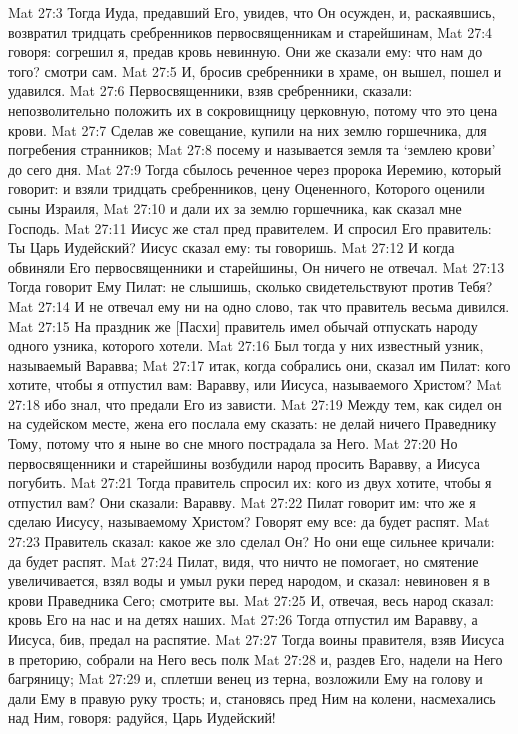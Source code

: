Mat 27:3  Тогда Иуда, предавший Его, увидев, что Он осужден, и, раскаявшись, возвратил тридцать сребренников первосвященникам и старейшинам,
Mat 27:4  говоря: согрешил я, предав кровь невинную. Они же сказали ему: что нам до того? смотри сам.
Mat 27:5  И, бросив сребренники в храме, он вышел, пошел и удавился.
Mat 27:6  Первосвященники, взяв сребренники, сказали: непозволительно положить их в сокровищницу церковную, потому что это цена крови.
Mat 27:7  Сделав же совещание, купили на них землю горшечника, для погребения странников;
Mat 27:8  посему и называется земля та `землею крови' до сего дня.
Mat 27:9  Тогда сбылось реченное через пророка Иеремию, который говорит: и взяли тридцать сребренников, цену Оцененного, Которого оценили сыны Израиля,
Mat 27:10  и дали их за землю горшечника, как сказал мне Господь.
Mat 27:11  Иисус же стал пред правителем. И спросил Его правитель: Ты Царь Иудейский? Иисус сказал ему: ты говоришь.
Mat 27:12  И когда обвиняли Его первосвященники и старейшины, Он ничего не отвечал.
Mat 27:13  Тогда говорит Ему Пилат: не слышишь, сколько свидетельствуют против Тебя?
Mat 27:14  И не отвечал ему ни на одно слово, так что правитель весьма дивился.
Mat 27:15  На праздник же [Пасхи] правитель имел обычай отпускать народу одного узника, которого хотели.
Mat 27:16  Был тогда у них известный узник, называемый Варавва;
Mat 27:17  итак, когда собрались они, сказал им Пилат: кого хотите, чтобы я отпустил вам: Варавву, или Иисуса, называемого Христом?
Mat 27:18  ибо знал, что предали Его из зависти.
Mat 27:19  Между тем, как сидел он на судейском месте, жена его послала ему сказать: не делай ничего Праведнику Тому, потому что я ныне во сне много пострадала за Него.
Mat 27:20  Но первосвященники и старейшины возбудили народ просить Варавву, а Иисуса погубить.
Mat 27:21  Тогда правитель спросил их: кого из двух хотите, чтобы я отпустил вам? Они сказали: Варавву.
Mat 27:22  Пилат говорит им: что же я сделаю Иисусу, называемому Христом? Говорят ему все: да будет распят.
Mat 27:23  Правитель сказал: какое же зло сделал Он? Но они еще сильнее кричали: да будет распят.
Mat 27:24  Пилат, видя, что ничто не помогает, но смятение увеличивается, взял воды и умыл руки перед народом, и сказал: невиновен я в крови Праведника Сего; смотрите вы.
Mat 27:25  И, отвечая, весь народ сказал: кровь Его на нас и на детях наших.
Mat 27:26  Тогда отпустил им Варавву, а Иисуса, бив, предал на распятие.
Mat 27:27  Тогда воины правителя, взяв Иисуса в преторию, собрали на Него весь полк
Mat 27:28  и, раздев Его, надели на Него багряницу;
Mat 27:29  и, сплетши венец из терна, возложили Ему на голову и дали Ему в правую руку трость; и, становясь пред Ним на колени, насмехались над Ним, говоря: радуйся, Царь Иудейский!
